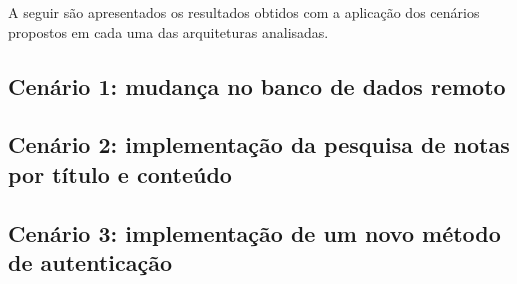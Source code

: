 A seguir são apresentados os resultados obtidos com a aplicação dos cenários propostos em cada uma das arquiteturas analisadas.

\subsection{Cenário 1: mudança no banco de dados remoto}



\subsection{Cenário 2: implementação da pesquisa de notas por título e conteúdo}



\subsection{Cenário 3: implementação de um novo método de autenticação}

